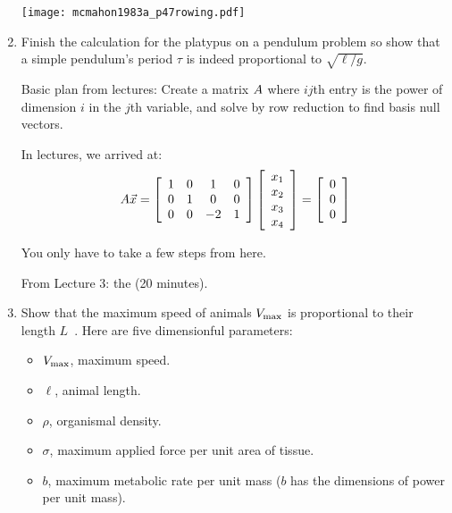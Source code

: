 \begin{enumerate}
  \texttt{[image: mcmahon1983a\_p47rowing.pdf]}

  
   \solutionstart


   \solutionend

  
\item
  Finish the calculation for the platypus on a pendulum problem
  so show that a simple pendulum's period $\tau$ is indeed proportional to
  $\sqrt{\ell / g}$.

  Basic plan from lectures: Create a matrix $\textmatrix{A}$
  where $ij$th entry is the power of dimension $i$ in the $j$th
  variable, and solve by row reduction to find basis null vectors.

  In lectures, we arrived at:
  \begin{equation}
  \textmatrix{A}\vec{x}
  =
  \mymatrix{cccc}{
    1 & 0 & 1 & 0 \\
    0 & 1 &  0 & 0 \\
    0 & 0 & -2 & 1 \\
  }
  \colvec{ x_{1} \\ x_{2} \\ x_{3} \\ x_{4} }
  = 
  \colvec{ 0 \\ 0 \\ 0}
  \end{equation}

  You only have to take a few steps from here.


  From Lecture 3:
  the  (20 minutes).
  
  
   \solutionstart


   \solutionend

\item

  Show that the maximum speed of animals $V_{\textnormal{max}}$
  is proportional to their length $L$~\cite{meyer-vernet2015a}.
  Here are five dimensionful parameters:
  \begin{itemize}
  \item 
    $V_{\textnormal{max}}$, maximum speed.
  \item 
    $\ell$, animal length.
  \item 
    $\rho$, organismal density.
  \item 
    $\sigma$, maximum applied force per unit area of tissue.
  \item 
    $b$, maximum metabolic rate per unit mass
    ($b$ has the dimensions of power per unit mass).
  \end{itemize}
  

\end{enumerate}
